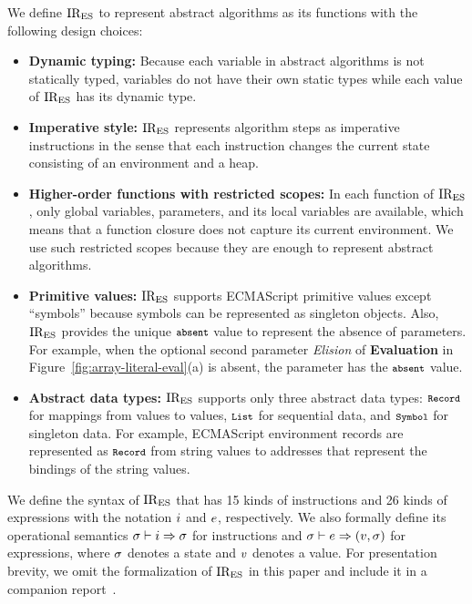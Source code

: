 We define \( \text{IR}_\text{ES} \) to represent abstract algorithms as its
functions with the following design choices:
\begin{itemize}[leftmargin=0.5cm]
\item \textbf{Dynamic typing:} Because each variable in abstract
algorithms is not statically typed, variables do not have their own
static types while each value of \( \text{IR}_\text{ES} \) has its dynamic type.

\item \textbf{Imperative style:} \( \text{IR}_\text{ES} \) represents algorithm steps
as imperative instructions in the sense that each instruction changes
the current state consisting of an environment and a heap.

\item \textbf{Higher-order functions with restricted scopes:}
In each function of \( \text{IR}_\text{ES} \), only global variables, parameters,
and its local variables are available, which means that a function
closure does not capture its current environment.  We use such
restricted scopes because they are enough to represent abstract
algorithms.

\item \textbf{Primitive values:} \( \text{IR}_\text{ES} \) supports ECMAScript primitive
values except ``symbols'' because symbols can be represented as singleton
objects.  Also, \( \text{IR}_\text{ES} \) provides the unique \( \texttt{\footnotesize absent} \) value to
represent the absence of parameters.  For example, when the optional second
parameter \textit{Elision} of \textbf{Evaluation} in
Figure~\ref{fig:array-literal-eval}(a) is absent, the parameter has the \(
\texttt{\footnotesize absent} \) value.

\item \textbf{Abstract data types:} \( \text{IR}_\text{ES} \) supports only three abstract
data types: \( \texttt{\footnotesize Record} \) for mappings from values to values,
\( \texttt{\footnotesize List} \) for sequential data, and \( \texttt{\footnotesize Symbol} \) for singleton
data.  For example, ECMAScript environment records are represented as \(
\texttt{\footnotesize Record} \) from string values to addresses that represent the
bindings of the string values.
\end{itemize}
We define the syntax of \( \text{IR}_\text{ES} \) that has 15 kinds of instructions and 26 kinds
of expressions with the notation \( i \) and \( e \), respectively.
We also formally define its operational semantics \(
\sigma \vdash i \Rightarrow \sigma \) for instructions and
\( \sigma \vdash e \Rightarrow (v, \sigma) \) for expressions,
where \( \sigma \) denotes a state and \( v \) denotes a value.
For presentation brevity, we omit the formalization of \( \text{IR}_\text{ES} \) in this paper
and include it in a companion report~\cite{report}.


